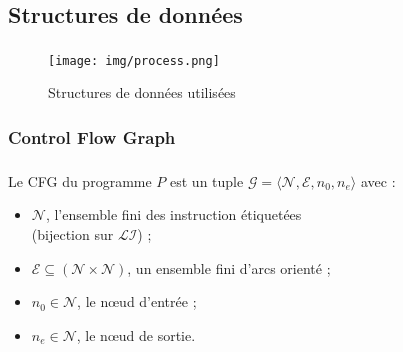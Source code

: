 \documentclass{beamer}
\begin{document}
      \subsection{Structures de données}

      \begin{frame}
        \frametitle{\secname}
        \framesubtitle{\subsecname}

        \begin{figure}
          \centering
          \texttt{[image: img/process.png]}
          \caption{Structures de données utilisées}
        \end{figure}
      \end{frame}
      
      \subsubsection*{Control Flow Graph}
      \begin{frame}
        \frametitle{\subsecname}
        \framesubtitle{\subsubsecname}
        
        
        Le CFG du programme $P$ est un tuple $\mathcal{G} = \langle
        \mathcal{N},\mathcal{E},n_0,n_e \rangle$ avec :
        \begin{itemize}
          \item $\mathcal{N}$, l'ensemble fini des instruction étiquetées\\
            (bijection sur $\mathcal{LI}$) ;
          \item $\mathcal{E} \subseteq (\mathcal{N} \times \mathcal{N})$, un
            ensemble fini d'arcs orienté ;
          \item $n_0 \in \mathcal{N}$, le n{\oe}ud d'entrée ;
          \item $n_e \in \mathcal{N}$, le n{\oe}ud de sortie.
        \end{itemize}
      \end{frame}
\end{document}

